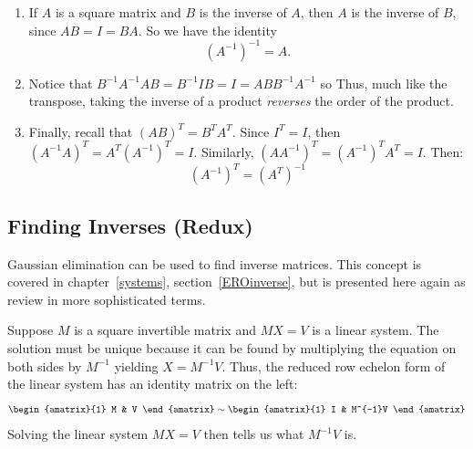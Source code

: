 \begin{enumerate}
\item If $A$ is a square matrix and $B$ is the inverse of $A$, then $A$ is the inverse of $B$, since $AB=I=BA$.  So we have the identity
\[
(A^{-1})^{-1}=A.
\]

\item Notice that $B^{-1}A^{-1}AB=B^{-1}IB=I=ABB^{-1}A^{-1}$ so
Thus, much like the transpose, taking the inverse of a product \emph{reverses} the order of the product.



\item Finally, recall that $(AB)^T=B^TA^T$.  Since $I^T=I$, then $(A^{-1}A)^T=A^T(A^{-1})^T=I$.  Similarly, $(AA^{-1})^T=(A^{-1})^TA^T=I$.  Then:
\[
(A^{-1})^T=(A^T)^{-1}
\]
\end{enumerate}





\subsection{Finding Inverses (Redux)}

Gaussian elimination can be used to find inverse matrices. This concept is covered in chapter~\ref{systems}, section~\ref{EROinverse},
but is presented here again as review in more sophisticated terms.


Suppose $M$ is a square invertible matrix and $MX=V$ is a linear system. The   solution
must be unique because it can be found by multiplying the equation on both sides by $M^{-1}$
yielding
 $X=M^{-1}V$. Thus,
the reduced row echelon form of the linear system has an identity matrix on the left:
\[
\begin{amatrix}{1}
M & V
\end{amatrix}
\sim
\begin{amatrix}{1}
I & M^{-1}V
\end{amatrix}
\]
Solving the linear system $MX=V$ then tells us what $M^{-1}V$ is.  

